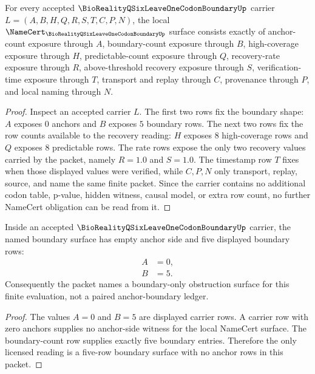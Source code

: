 \begin{theorem}
\label{thm:bioreality-q-six-leave-one-codon-boundary-namecert-obligations}
For every accepted $\BioRealityQSixLeaveOneCodonBoundaryUp$ carrier $L=(A,B,H,Q,R,S,T,C,P,N)$, the local $\NameCert_{\BioRealityQSixLeaveOneCodonBoundaryUp}$ surface consists exactly of anchor-count exposure through $A$, boundary-count exposure through $B$, high-coverage exposure through $H$, predictable-count exposure through $Q$, recovery-rate exposure through $R$, above-threshold recovery exposure through $S$, verification-time exposure through $T$, transport and replay through $C$, provenance through $P$, and local naming through $N$.
\end{theorem}

\begin{proof}
Inspect an accepted carrier $L$. The first two rows fix the boundary shape: $A$ exposes $0$ anchors and $B$ exposes $5$ boundary rows. The next two rows fix the row counts available to the recovery reading: $H$ exposes $8$ high-coverage rows and $Q$ exposes $8$ predictable rows. The rate rows expose the only two recovery values carried by the packet, namely $R=1.0$ and $S=1.0$. The timestamp row $T$ fixes when those displayed values were verified, while $C,P,N$ only transport, replay, source, and name the same finite packet. Since the carrier contains no additional codon table, p-value, hidden witness, causal model, or extra row count, no further NameCert obligation can be read from it.
\end{proof}

\begin{theorem}
\label{thm:bioreality-q-six-leave-one-codon-boundary-zero-anchor-five-boundary}
Inside an accepted $\BioRealityQSixLeaveOneCodonBoundaryUp$ carrier, the named boundary surface has empty anchor side and five displayed boundary rows:
$$
\begin{aligned}
A&=0,\\
B&=5.
\end{aligned}
$$
Consequently the packet names a boundary-only obstruction surface for this finite evaluation, not a paired anchor-boundary ledger.
\end{theorem}

\begin{proof}
The values $A=0$ and $B=5$ are displayed carrier rows. A carrier row with zero anchors supplies no anchor-side witness for the local NameCert surface. The boundary-count row supplies exactly five boundary entries. Therefore the only licensed reading is a five-row boundary surface with no anchor rows in this packet.
\end{proof}


